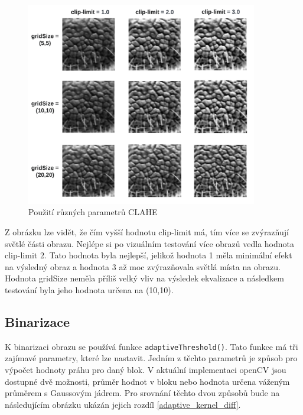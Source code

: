 \begin{figure}[h]
	\centering
	\includegraphics[width=0.9\textwidth]{obrazky/clahe_parametry.png}
	\caption{Použití různých parametrů CLAHE}
	\label{clahe_param}
\end{figure} 

Z obrázku lze vidět, že čím vyšší hodnotu clip-limit má, tím více se zvýrazňují světlé části obrazu. Nejlépe si po vizuálním testování více obrazů vedla hodnota clip-limit 2. Tato hodnota byla nejlepší, jelikož hodnota 1 měla minimální efekt na výsledný obraz a hodnota 3 až moc zvýrazňovala světlá místa na obrazu. Hodnota gridSize neměla příliš velký vliv na výsledek ekvalizace a následkem testování byla jeho hodnota určena na (10,10).


\subsection{Binarizace}
K binarizaci obrazu se používá funkce \texttt{adaptiveThreshold()}. Tato funkce má tři zajímavé parametry, které lze nastavit. Jedním z těchto parametrů je způsob pro výpočet hodnoty práhu pro daný blok. V aktuální implementaci openCV jsou dostupné dvě možnosti, průměr hodnot v bloku nebo hodnota určena váženým průměrem s Gaussovým jádrem. Pro srovnání těchto dvou způsobů bude na následujícím obrázku ukázán jejich rozdíl \ref{adaptive_kernel_diff}.

